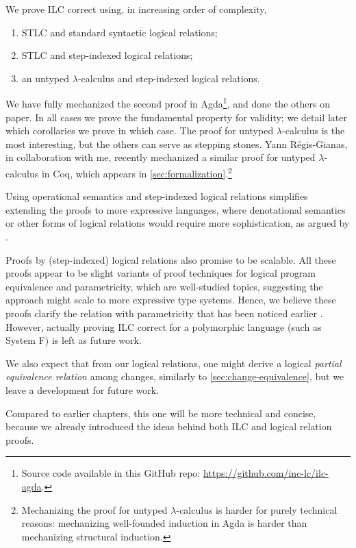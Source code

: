 We prove ILC correct using, in increasing order of complexity,
\begin{enumerate}
\item STLC and standard syntactic logical relations;
\item STLC and step-indexed logical relations;
\item an untyped $\lambda$-calculus and step-indexed logical relations.
\end{enumerate}
We have fully mechanized the second proof in Agda\footnote{Source code available
in this GitHub repo: \url{https://github.com/inc-lc/ilc-agda}.}, and done the
others on paper. In all cases we prove the fundamental property for
validity; we detail later which corollaries we prove in which
case.
The proof for untyped $\lambda$-calculus is the most
interesting, but the others can serve as stepping stones.
Yann Régis-Gianas, in collaboration with me, recently mechanized a similar proof
for untyped $\lambda$-calculus in Coq, which appears in
\cref{sec:formalization}.\footnote{Mechanizing the proof for untyped
  $\lambda$-calculus is harder for purely technical reasons:
  mechanizing well-founded induction in Agda is harder than
  mechanizing structural induction.}

Using operational semantics and step-indexed logical relations
simplifies extending the proofs to more expressive languages,
where denotational semantics or other forms of logical relations
would require more sophistication, as argued by
\citet{Ahmed2006stepindexed}.

Proofs by (step-indexed) logical relations also promise to be
scalable. All these proofs appear to be slight variants of
proof techniques for logical program equivalence and
parametricity, which are well-studied topics, suggesting the
approach might scale to more expressive type systems. Hence, we
believe these proofs clarify the relation with parametricity that
has been noticed earlier \citep{Atkey2015ILC}. However, actually
proving ILC correct for a polymorphic language (such as System F)
is left as future work.

We also expect that from our logical relations, one might derive a logical
\emph{partial equivalence relation} among changes, similarly to
\cref{sec:change-equivalence}, but we leave a development for future work.

Compared to earlier chapters, this one will be more technical and
concise, because we already introduced the ideas behind both ILC
and logical relation proofs.

